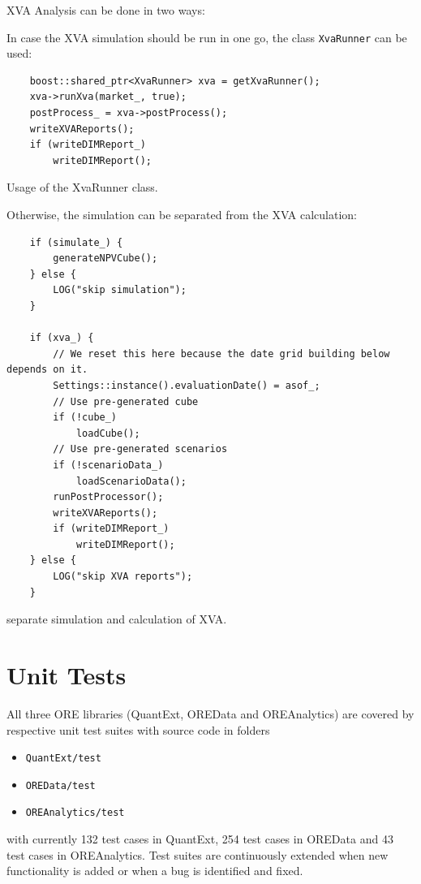 \documentclass[12pt, a4paper]{article}
\begin{document}
XVA Analysis can be done in two ways:

In case the XVA simulation should be run in one go, the class {\tt XvaRunner} can be used:

\begin{listing}[H]
\begin{verbatim}
	boost::shared_ptr<XvaRunner> xva = getXvaRunner();
	xva->runXva(market_, true);
	postProcess_ = xva->postProcess();
	writeXVAReports();
	if (writeDIMReport_)
		writeDIMReport();
\end{verbatim}
\caption{Usage of the XvaRunner class.}
\label{1st:XvaRunner}
\end{listing}

Otherwise, the simulation can be separated from the XVA calculation:

\begin{listing}[H]
\begin{verbatim}
	if (simulate_) {
		generateNPVCube();
	} else {
		LOG("skip simulation");
	}

	if (xva_) {
		// We reset this here because the date grid building below depends on it.
		Settings::instance().evaluationDate() = asof_;
		// Use pre-generated cube
		if (!cube_)
			loadCube();
		// Use pre-generated scenarios
		if (!scenarioData_)
			loadScenarioData();
		runPostProcessor();
		writeXVAReports();
		if (writeDIMReport_)
			writeDIMReport();
	} else {
		LOG("skip XVA reports");
	}
\end{verbatim}
\caption{separate simulation and calculation of XVA.}
\label{1st:SeparateSimXVA}
\end{listing}

\section{Unit Tests}
All three ORE libraries (QuantExt, OREData and OREAnalytics) are covered by respective unit test suites with source code in folders
\begin{itemize}
\item {\tt QuantExt/test}
\item {\tt OREData/test}
\item {\tt OREAnalytics/test}
\end{itemize}
with currently 132 test cases in QuantExt, 254 test cases in OREData and 43 test cases in OREAnalytics. Test suites are continuously extended when new functionality is added or when a bug is identified and fixed.
\end{document}

